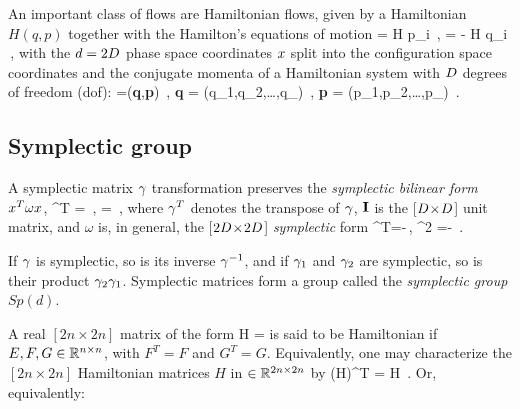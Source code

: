 An important class of flows are Hamiltonian flows,
given by a
Hamiltonian $H(q,p)$ together with the Hamilton's
equations of motion
\beq
{} = {\partial H \over \partial p_i}
    \,, \quad\quad  %
 = - {\partial H \over \partial q_i}
\,,
with the $d= 2D$ phase space coordinates $x$ split into
the configuration space coordinates and the
conjugate momenta of a Hamiltonian system with $D$ degrees of freedom
(dof):
\beq
\pSpace=({\bf q},{\bf p})
\,,\qquad
{\bf q} = (q_1,q_2,\dots,q_\DOF)
\,,\qquad
{\bf p} = (p_1,p_2,\dots,p_\DOF)
\,.

\subsection{Symplectic group}
\label{sect:SymplctGroup}

A symplectic matrix $\gamma$ transformation preserves the
\emph{symplectic bilinear form} $x^T {\bf \omega} x$,
\beq
\LieEl^T {\bf \omega} \LieEl = {\bf \omega}
    \,, \quad\quad
{\omega} = 
	\,,
where
$\gamma^T$ denotes the transpose of $\gamma$, ${\bf I}$ is the
[$D\!\times\!D$] unit matrix, and ${\omega}$ is, in general, the
[$2D\!\times\!2D$] {\em symplectic} form
\beq
{\bf \omega}^T=-{\bf \omega}\,,
\qquad {\bf \omega}^2 =- \matId
\,.


If $\gamma$ is symplectic,
so is its inverse $\gamma^{-1}$, and if $\gamma_1$ and $\gamma_2$ are
symplectic, so is their product $\gamma_2 \gamma_1$. Symplectic matrices
form a group called the \emph{symplectic group} $Sp(d)$.

A real $[\!2n\times\!2n]$ matrix of the form
\beq
H = 
is said to be Hamiltonian if $E, F, G \in \mathbb{R}^{n \times n}$,
 with $F^T = F$ and $G^T = G$. Equivalently, one
may characterize the $[\!2n\times\!2n]$  Hamiltonian matrices $H$
in $\in \mathbb{R}^{2n \times 2n}$ by
\beq
({\bf \omega}H)^T = {\bf \omega}H
\,.
Or, equivalently:

